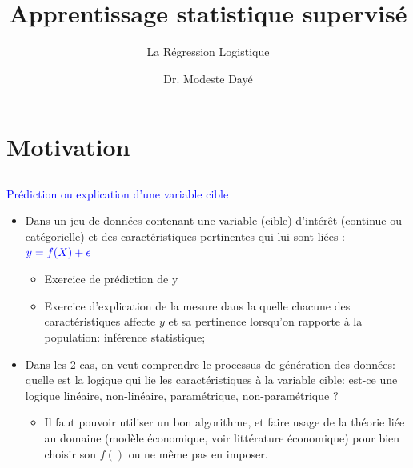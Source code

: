 \documentclass[12pt,aspectratio=1610]{beamer}
\title[Intro Stat \& Proba] %
{\bf Apprentissage statistique supervisé}
\subtitle
{La Régression Logistique} %
\author[]{Dr. Modeste Dayé} %
{  }
\institute[]{ \textbf{EEIA 2023}\\  \textit{}}
\begin{document}
\begin{frame}
  \titlepage
 \end{frame}

\section*{}
\tableofcontents


\section{Motivation}
\subsection{}

\begin{frame}
	
	\textcolor{blue}{Prédiction ou explication d'une variable cible}
	
	\begin{itemize}
		\item Dans un jeu de données contenant  une variable (cible) d'intérêt (continue ou catégorielle) et des caractéristiques pertinentes qui lui sont liées :
		 $ \textcolor{blue}{y= f(X) + \epsilon}$
		
		\begin{itemize}
			\item Exercice de prédiction de y
			\item Exercice d'explication de la mesure dans la quelle chacune des caractéristiques affecte $y$ et sa pertinence lorsqu'on rapporte à la population: inférence statistique;
		\end{itemize}
		
			
		
		\item Dans les 2 cas, on veut comprendre le processus de génération des données: quelle est la logique qui lie les caractéristiques à la variable cible: est-ce une logique linéaire, non-linéaire, paramétrique, non-paramétrique ?
		
	\begin{itemize}
		\item Il faut pouvoir utiliser un bon algorithme, et faire usage de la théorie liée au domaine (modèle économique, voir littérature économique) pour bien choisir son $f()$ ou ne même pas en imposer.
	\end{itemize}
		
	\end{itemize}
\end{frame}
\end{document}
